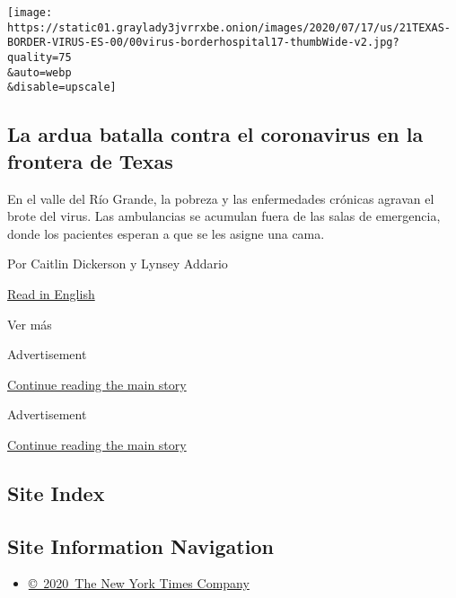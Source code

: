 \begin{enumerate}
  \texttt{[image: https://static01.graylady3jvrrxbe.onion/images/2020/07/17/us/21TEXAS-BORDER-VIRUS-ES-00/00virus-borderhospital17-thumbWide-v2.jpg?quality=75\\\&auto=webp\\\&disable=upscale]}

  \hypertarget{la-ardua-batalla-contra-el-coronavirus-en-la-frontera-de-texas}{%
  \subsection{La ardua batalla contra el coronavirus en la frontera de
  Texas}\label{la-ardua-batalla-contra-el-coronavirus-en-la-frontera-de-texas}}

  En el valle del Río Grande, la pobreza y las enfermedades crónicas
  agravan el brote del virus. Las ambulancias se acumulan fuera de las
  salas de emergencia, donde los pacientes esperan a que se les asigne
  una cama.

  Por Caitlin Dickerson y Lynsey Addario

  \href{https://www.nytimes3xbfgragh.onion/2020/07/19/us/coronavirus-texas-rio-grande-valley.html}{Read
  in English}
\end{enumerate}

Ver más

Advertisement

\protect\hyperlink{after-mid2}{Continue reading the main story}

Advertisement

\protect\hyperlink{after-mktg}{Continue reading the main story}

\hypertarget{site-index}{%
\subsection{Site Index}\label{site-index}}

\hypertarget{site-information-navigation}{%
\subsection{Site Information
Navigation}\label{site-information-navigation}}

\begin{itemize}
\tightlist
\item
  \href{https://help.nytimes3xbfgragh.onion/hc/en-us/articles/115014792127-Copyright-notice}{©~2020~The
  New York Times Company}
\end{itemize}

